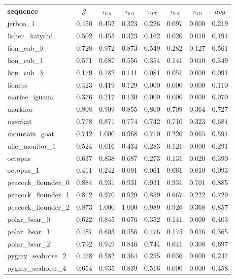 \begin{table*}[]
\begin{tabular}{l|c|cccccc}
sequence & $\mathcal{J}$ & $\tau_{0.5}$ & $\tau_{0.6}$ & $\tau_{0.7}$ & $\tau_{0.8}$ & $\tau_{0.9}$ & $avg$ \\ \hline
jerboa\_1 & 0.450 & 0.452 & 0.323 & 0.226 & 0.097 & 0.000 & 0.219 \\
lichen\_katydid & 0.502 & 0.455 & 0.323 & 0.162 & 0.020 & 0.010 & 0.194 \\
lion\_cub\_0 & 0.728 & 0.972 & 0.873 & 0.549 & 0.282 & 0.127 & 0.561 \\
lion\_cub\_1 & 0.571 & 0.687 & 0.556 & 0.354 & 0.141 & 0.010 & 0.349 \\ 
lion\_cub\_3 & 0.179 & 0.182 & 0.141 & 0.081 & 0.051 & 0.000 & 0.091 \\ 
lioness & 0.423 & 0.419 & 0.129 & 0.000 & 0.000 & 0.000 & 0.110 \\
marine\_iguana & 0.376 & 0.217 & 0.130 & 0.000 & 0.000 & 0.000 & 0.070 \\
markhor & 0.808 & 0.909 & 0.855 & 0.800 & 0.709 & 0.364 & 0.727 \\
meerkat & 0.778 & 0.871 & 0.774 & 0.742 & 0.710 & 0.323 & 0.684 \\
mountain\_goat & 0.742 & 1.000 & 0.968 & 0.710 & 0.226 & 0.065 & 0.594 \\
nile\_monitor\_1 & 0.524 & 0.616 & 0.434 & 0.283 & 0.121 & 0.000 & 0.291 \\
octopus & 0.637 & 0.838 & 0.687 & 0.273 & 0.131 & 0.020 & 0.390 \\
octopus\_1 & 0.411 & 0.242 & 0.091 & 0.061 & 0.061 & 0.010 & 0.093 \\
peacock\_flounder\_0 & 0.884 & 0.931 & 0.931 & 0.931 & 0.931 & 0.701 & 0.885 \\
peacock\_flounder\_1 & 0.812 & 0.970 & 0.929 & 0.859 & 0.667 & 0.222 & 0.729 \\
peacock\_flounder\_2 & 0.873 & 1.000 & 1.000 & 0.989 & 0.926 & 0.368 & 0.857 \\
polar\_bear\_0 & 0.622 & 0.845 & 0.676 & 0.352 & 0.141 & 0.000 & 0.403 \\
polar\_bear\_1 & 0.487 & 0.603 & 0.556 & 0.476 & 0.175 & 0.016 & 0.365 \\
polar\_bear\_2 & 0.792 & 0.949 & 0.846 & 0.744 & 0.641 & 0.308 & 0.697 \\
pygmy\_seahorse\_2 & 0.478 & 0.582 & 0.364 & 0.255 & 0.036 & 0.000 & 0.247 \\
pygmy\_seahorse\_4 & 0.654 & 0.935 & 0.839 & 0.516 & 0.000 & 0.000 & 0.458 \\

\end{tabular}
\end{table*}
